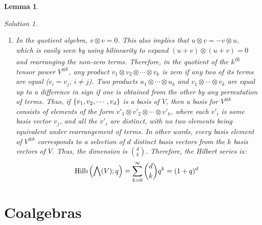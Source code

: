 \documentclass{article}
\newtheorem{Lemma}{Lemma}
\theoremstyle{definition}
\theoremstyle{remark}
\newtheorem*{Solution*}{Solution}
\theoremstyle{underline}
\theoremstyle{underline}
\DeclareMathOperator{\Hilb}{Hilb}
\renewcommand{\th}{\textsuperscript{th}\xspace}
\begin{document}
\begin{Lemma}
\begin{Solution*}
\begin{enumerate}[label=(\alph*)]
			\item In the quotient algebra, $v \otimes v = 0$. This also implies that $u \otimes v = - v \otimes u$, which is easily seen by using bilinearity to expand $(u + v) \otimes (u + v) = 0$ and rearranging the non-zero terms. Therefore, in the quotient of the $k$\th tensor power $V^{\otimes k}$, any product $v_1 \otimes v_2 \otimes \cdots \otimes v_k$ is zero if any two of its terms are equal ($v_i = v_j$, $i \ne j$). Two products $u_1 \otimes \cdots \otimes u_k$ and $v_1 \otimes \cdots \otimes v_k$ are equal up to a difference in sign if one is obtained from the other by any permutation of terms. Thus, if $\qty{v_1, v_2, \cdots, v_d}$ is a basis of $V$, then a basis for $V^{\otimes k}$ consists of elements of the form $v'_1 \otimes v'_2 \otimes \cdots \otimes v'_k$, where each $v'_i$ is some basis vector $v_j$, and all the $v'_i$ are distinct, with no two elements being equivalent under rearrangement of terms. In other words, every basis element of $V^{\otimes k}$ corresponds to a selection of $d$ distinct basis vectors from the $k$ basis vectors of $V$. Thus, the dimension is $\binom d k$. Therefore, the Hilbert series is:
			\begin{gather*}
				\Hilb\pqty{\bigwedge(V);q} = \sum_{k=0}^{\infty} \binom d k q^k = (1 + q)^d
			\end{gather*}
 		\end{enumerate}
	\end{Solution*}


	\section{Coalgebras}


\end{Lemma}
\end{document}
